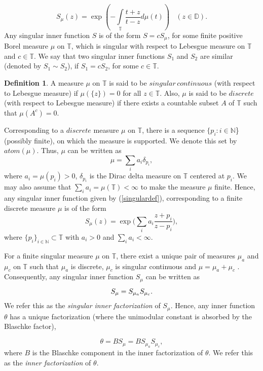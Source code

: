 \documentclass[12pt, reqno]{amsart}
\theoremstyle{definition}
\newtheorem{definition}[theorem]{Definition}
\numberwithin{equation}{section}
\begin{document}
\begin{equation}\label{singulardef}
	S_{\mu}(z)= \exp\left(-\int\limits_{\mathbb{T}}\dfrac{t+z}{t-z}d\mu(t)\right)~~~~
	(z\in \mathbb{D}).
\end{equation}
Any singular inner function $S$ is of the form
$S=cS_{\mu}$,
for some finite positive Borel measure $\mu$ on $\mathbb{T}$, which is singular with respect
to Lebesgue measure on $\mathbb{T}$
and $c\in\mathbb{T}$. We say that two singular inner functions $S_1$ and $S_2$ are similar (denoted by $S_1\sim S_2 $), if  $S_1=cS_2$, for some $c \in \mathbb{T}$.
\begin{definition}\label{def}\cite[Definition 7.11 \& 7.12]{measure}
	A measure $\mu $ on 
	$\mathbb{T}$ is  said to be $ singular\, continuous$ (with respect to Lebesgue measure) if $\mu(\{z\})=0$ for all $z \in \mathbb{T}$. Also, $\mu$ is said to be $discrete$ (with respect to Lebesgue measure) if there exists a countable subset $A$ of $\mathbb{T}$ such that $\mu(A^c)=0$.
\end{definition}
Corresponding to a $discrete$  measure $\mu$ on $\mathbb{T}$, there is a sequence $\{p_i:i\in \mathbb{N}$\} (possibly finite), on which the measure is supported. We denote this set by $atom(\mu)$. Thus, $\mu$ can be written as
$$\mu=\sum\limits_{i}a_{i}\delta_{p_i},$$
where $a_i=\mu(p_i)>0$, 
$\delta_{p_i}$ is the Dirac delta measure on $\mathbb{T}$ centered at $p_i$. We may also assume that $\sum_{i}a_i=\mu(\mathbb{T})<\infty$ to make the measure $\mu$ finite. Hence, any singular inner function given by (\ref{singulardef}), corresponding to a finite discrete measure $\mu$ is of the form
$$S_\mu(z)=\exp\Big({\sum\limits_ia_i\frac{z+p_i}{z-p_i}}\Big),$$
where $\{p_i\}_{i \in \mathbb{N} }\subset \mathbb{T}$ with $a_i>0$ and $\sum_{i}a_{i}<\infty$.

For a finite singular measure $\mu$ on $\mathbb{T}$, there exist a unique pair of measures $\mu_a$ and $\mu_c$ on $\mathbb{T}$ such that $\mu_a$ is discrete, $\mu_c$ is singular continuous  and $\mu=\mu_a+\mu_c$ \cite[Proposition 7.13]{measure}. Consequently, any singular inner function $S_\mu$ can be written as
\begin{equation*}{\label{sdecom}}
	S_\mu=S_{\mu_a}S_{\mu_c}.
\end{equation*}
We refer this as the \textit{singular inner factorization} of $S_\mu$.
Hence, any inner function $\theta$ has a unique factorization (where the unimodular constant is absorbed by the Blaschke factor),

\begin{equation*}\label{idecom}
	\theta =BS_\mu= BS_{\mu_a}S_{\mu_c},
\end{equation*} where $B$ is the Blaschke component in the inner factorization  of $\theta$. We refer this as the \textit{inner factorization} of $\theta$.
\end{document}
